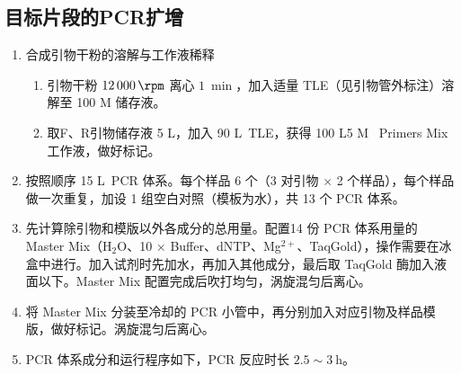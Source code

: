 \documentclass[10pt]{article}
\newcommand{\ul}{\textmu L}
\begin{document}
\subsection{目标片段的PCR扩增}
\begin{enumerate}
    \item 合成引物干粉的溶解与工作液稀释
    \begin{enumerate}
        \item 引物干粉 $\qty{12000}{\rpm}$ 离心 $\qty{1}{\min}$，加入适量 TLE（见引物管外标注）溶解至 100 \textmu M 储存液。
        \item 取F、R引物储存液 5 \ul，加入 90 \ul \ TLE，获得 100 \ul 5 \textmu M \ Primers Mix 工作液，做好标记。
    \end{enumerate}
    \item 按照顺序 15 \ul \ PCR 体系。每个样品 6 个（3 对引物 $\times$ 2 个样品），每个样品做一次重复，加设 1 组空白对照（模板为水），共 13 个 PCR 体系。
    \item 先计算除引物和模版以外各成分的总用量。配置14 份 PCR 体系用量的 Master Mix（H$_2$O、10 $\times$ Buffer、dNTP、Mg$^{2+}$、TaqGold），操作需要在冰盒中进行。加入试剂时先加水，再加入其他成分，最后取 TaqGold 酶加入液面以下。Master Mix 配置完成后吹打均匀，涡旋混匀后离心。
    \item 将 Master Mix 分装至冷却的 PCR 小管中，再分别加入对应引物及样品模版，做好标记。涡旋混匀后离心。
    \item PCR 体系成分和运行程序如下，PCR 反应时长 $2.5 \sim \qty{3}{\hour}$。


\end{enumerate}
\end{document}
